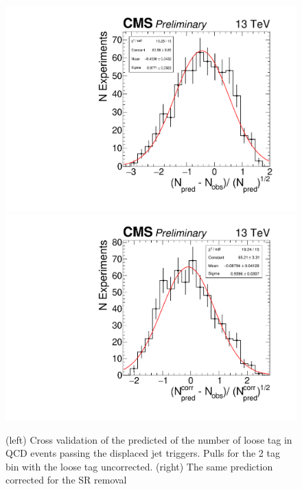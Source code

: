 \begin{figure}
\begin{center}
\includegraphics[width=.45\textwidth]{figures/an/ANALYSIS/pulls/qcd_loose_uncorrected_2tag.pdf}
\includegraphics[width=.45\textwidth]{figures/an/ANALYSIS/pulls/qcd_loose_corrected_2tag.pdf}
\caption{(left) Cross validation of the predicted of the number of loose tag in QCD events passing the displaced jet triggers. Pulls for the 2 tag bin with the loose tag uncorrected. (right) The same prediction corrected for the SR removal  \label{fig:qcd_2tag_xval}}
\end{center}
\end{figure}


